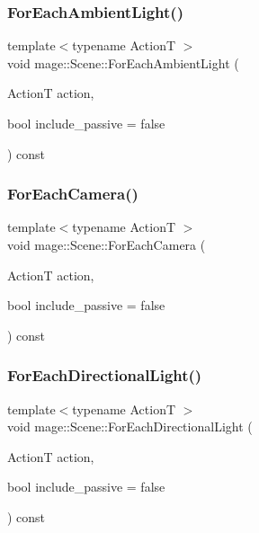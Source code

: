 \hypertarget{classmage_1_1_scene_a0b05bd65003dfb02124dd00762950a16}{}\label{classmage_1_1_scene_a0b05bd65003dfb02124dd00762950a16} 
\subsubsection{\texorpdfstring{For\+Each\+Ambient\+Light()}{ForEachAmbientLight()}}
{\footnotesize\ttfamily template$<$typename ActionT $>$ \\
void mage\+::\+Scene\+::\+For\+Each\+Ambient\+Light (\begin{DoxyParamCaption}\item[{ActionT}]{action,  }\item[{bool}]{include\+\_\+passive = {\ttfamily false} }\end{DoxyParamCaption}) const}

\hypertarget{classmage_1_1_scene_a196159c991332f06faaee3c6ce0ff780}{}\label{classmage_1_1_scene_a196159c991332f06faaee3c6ce0ff780} 
\subsubsection{\texorpdfstring{For\+Each\+Camera()}{ForEachCamera()}}
{\footnotesize\ttfamily template$<$typename ActionT $>$ \\
void mage\+::\+Scene\+::\+For\+Each\+Camera (\begin{DoxyParamCaption}\item[{ActionT}]{action,  }\item[{bool}]{include\+\_\+passive = {\ttfamily false} }\end{DoxyParamCaption}) const}

\hypertarget{classmage_1_1_scene_ab1b4131911bf2457707fae459d999f85}{}\label{classmage_1_1_scene_ab1b4131911bf2457707fae459d999f85} 
\subsubsection{\texorpdfstring{For\+Each\+Directional\+Light()}{ForEachDirectionalLight()}}
{\footnotesize\ttfamily template$<$typename ActionT $>$ \\
void mage\+::\+Scene\+::\+For\+Each\+Directional\+Light (\begin{DoxyParamCaption}\item[{ActionT}]{action,  }\item[{bool}]{include\+\_\+passive = {\ttfamily false} }\end{DoxyParamCaption}) const}

